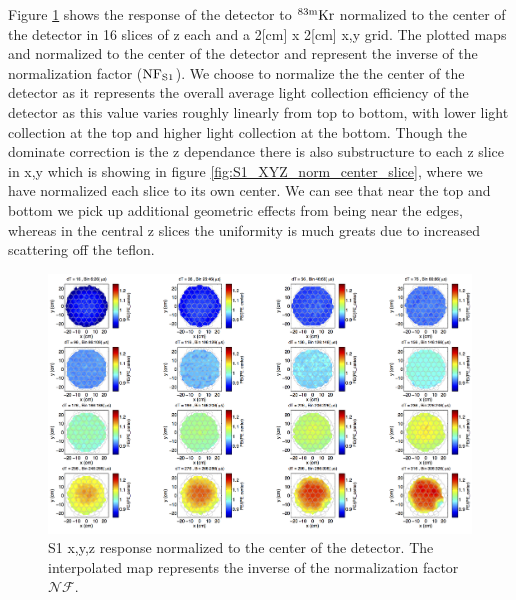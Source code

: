 Figure \ref{fig:S1_XYZ_norm_center} shows the response of the detector to $\rm^{83m}Kr$ normalized to the center of the detector in 16 slices of z each and a 2[cm] x 2[cm] x,y grid. The plotted maps and normalized to the center of the detector and represent the inverse of the normalization factor ($\rm NF_{S1}$). We choose to normalize the the center of the detector as it represents the overall average light collection efficiency of the detector as this value varies roughly linearly from top to bottom, with lower light collection at the top and higher light collection at the bottom. Though the dominate correction is the z dependance there is also substructure to each z slice in x,y which is showing in figure \ref{fig:S1_XYZ_norm_center_slice}, where we have normalized each slice to its own center. We can see that near the top and bottom we pick up additional geometric effects from being near the edges, whereas in the central z slices the uniformity is much greats due to increased scattering off the teflon.

\begin{figure}[h!]\centering
\includegraphics[width=150mm]{Chapter_XYZ_Corr/Thesis_Corr_Plots/S1_XYZ_Kr_norm_center_crop_80.png}
\caption{S1 x,y,z response normalized to the center of the detector. The interpolated map represents the inverse of the normalization factor $\mathcal{NF}$. }
\label{fig:S1_XYZ_norm_center}
\end{figure}


